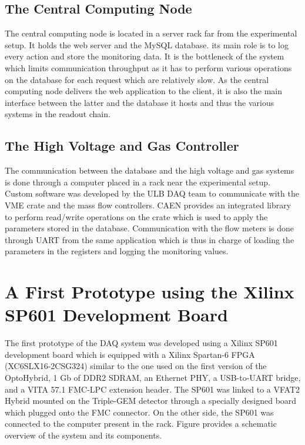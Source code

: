     \subsection{The Central Computing Node}

      The central computing node is located in a server rack far from the experimental setup. It holds the web server and the MySQL database. its main role is to log every action and store the monitoring data. It is the bottleneck of the system which limits communication throughput as it has to perform various operations on the database for each request which are relatively slow. As the central computing node delivers the web application to the client, it is also the main interface between the latter and the database it hosts and thus the various systems in the readout chain.

    \subsection{The High Voltage and Gas Controller}

      The communication between the database and the high voltage and gas systems is done through a computer placed in a rack near the experimental setup. Custom software was developed by the ULB DAQ team to communicate with the VME crate and the mass flow controllers. CAEN provides an integrated library to perform read/write operations on the crate which is used to apply the parameters stored in the database. Communication with the flow meters is done through UART from the same application which is thus in charge of loading the parameters in the registers and logging the monitoring values.

  \section{A First Prototype using the Xilinx SP601 Development Board}

    The first prototype of the DAQ system was developed using a Xilinx SP601 development board which is equipped with a Xilinx Spartan-6 FPGA (XC6SLX16-2CSG324) similar to the one used on the first version of the OptoHybrid, 1 Gb of DDR2 SDRAM, an Ethernet PHY, a USB-to-UART bridge, and a VITA 57.1 FMC-LPC extension header. The SP601 was linked to a VFAT2 Hybrid mounted on the Triple-GEM detector through a specially designed board which plugged onto the FMC connector. On the other side, the SP601 was connected to the computer present in the rack. Figure \label{fig:III-1-sys-1} provides a schematic overview of the system and its components.


